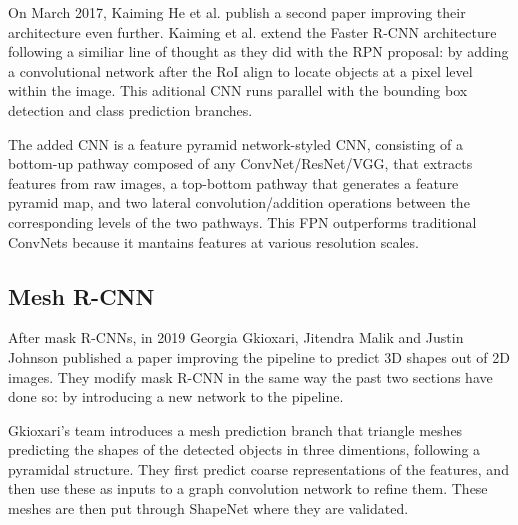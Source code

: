 \documentclass[10pt,a4paper,twocolumn,twoside]{article}
\begin{document}
On March 2017, Kaiming He et al.\cite{he_gkioxari_dollár_girshick_2017} publish a second paper improving their architecture even further. Kaiming et al. extend the Faster R-CNN architecture following a similiar line of thought as they did with the RPN proposal: by adding a convolutional network after the RoI align to locate objects at a pixel level within the image. This aditional CNN runs parallel with the bounding box detection and class prediction branches. 

The added CNN is a feature pyramid network-styled CNN, consisting of a bottom-up pathway composed of any ConvNet/ResNet/VGG, that extracts features from raw images, a top-bottom pathway that generates a feature pyramid map, and two lateral convolution/addition operations between the corresponding levels of the two pathways. This FPN outperforms traditional ConvNets because it mantains features at various resolution scales. 

\subsection{Mesh R-CNN}

After mask R-CNNs, in 2019 Georgia Gkioxari, Jitendra Malik and Justin Johnson\cite{gkioxari_malik_johnson_2019} published a paper improving the pipeline to predict 3D shapes out of 2D images. They modify mask R-CNN in the same way the past two sections have done so: by introducing a new network to the pipeline. 


Gkioxari's team introduces a mesh prediction branch that triangle meshes predicting the shapes of the detected objects in three dimentions, following a pyramidal structure. They first predict coarse representations of the features, and then use these as inputs to a graph convolution network to refine them. These meshes are then put through ShapeNet where they are validated.
\pagebreak


    
\end{document}
